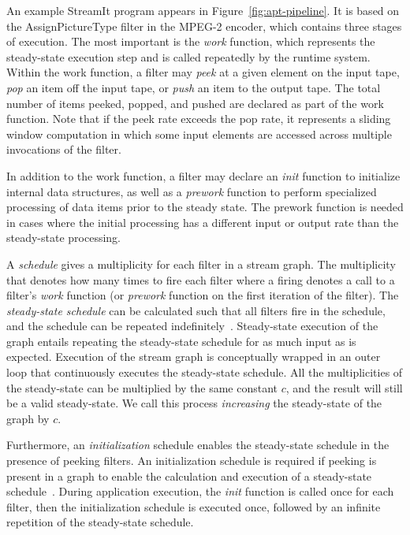 An example StreamIt program appears in Figure~\ref{fig:apt-pipeline}.
It is based on the AssignPictureType filter in the MPEG-2 encoder, which
contains three stages of execution.  The most important is the {\it work}
function, which represents the steady-state execution step and is called
repeatedly by the runtime system.  Within the work function, a filter may
{\it peek} at a given element on the input tape, {\it pop} an item off the 
input tape, or {\it push} an item to the output tape.  The total number of
items peeked, popped, and pushed are declared as part of the work
function.  Note that if the peek rate exceeds the pop rate, it
represents a sliding window computation in which some input elements
are accessed across multiple invocations of the filter.

In addition to the work function, a filter may declare an {\it init}
function to initialize internal data structures, as well as a {\it
  prework} function to perform specialized processing of data items
prior to the steady state.  The prework function is needed in cases
where the initial processing has a different input or output rate than
the steady-state processing.

A {\it schedule} gives a multiplicity for each filter in a stream
graph.  The multiplicity that denotes how many times to fire each
filter where a firing denotes a call to a filter's {\it work} function
(or {\it prework} function on the first iteration of the filter).  The
{\it steady-state schedule} can be calculated such that all filters
fire in the schedule, and the schedule can be repeated
indefinitely~\cite{lee87}.  Steady-state execution of the graph
entails repeating the steady-state schedule for as much input as is
expected.  Execution of the stream graph is conceptually wrapped in an
outer loop that continuously executes the steady-state schedule.  All
the multiplicities of the steady-state can be multiplied by the same
constant $c$, and the result will still be a valid steady-state.  We
call this process {\it increasing} the steady-state of the graph by
$c$.

Furthermore, an {\it initialization} schedule enables the steady-state
schedule in the presence of peeking filters.  An initialization
schedule is required if peeking is present in a graph to enable the
calculation and execution of a steady-state
schedule~\cite{karczmarek-lctes03}.  During application execution, the
{\it init} function is called once for each filter, then the
initialization schedule is executed once, followed by an infinite
repetition of the steady-state schedule.

